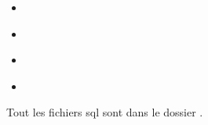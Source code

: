 \documentclass{article}
\begin{document}
\begin{itemize}
\item
  \href{https://github.com/ZGaillard/projet_session_2935/blob/main/database/DefGetCastings.sql}{}
  
\item
  \href{https://github.com/ZGaillard/projet_session_2935/blob/main/database/DefGetCompagnies.sql}{}
  
\item
  \href{https://github.com/ZGaillard/projet_session_2935/blob/main/database/DefGetMovies.sql}{}

\item
  \href{https://github.com/ZGaillard/projet_session_2935/blob/main/database/DefGetPlays.sql}{}

\end{itemize}

Tout les fichiers sql sont dans le dossier
\href{https://github.com/ZGaillard/projet_session_2935/tree/main/database}{}.

\subsection{}
\end{document}
